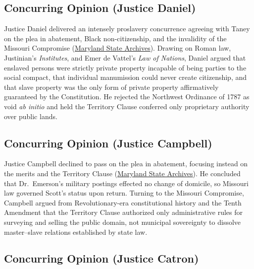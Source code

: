 \documentclass[12pt]{article}
\begin{document}
\subsection{Concurring Opinion (Justice Daniel)}

Justice Daniel delivered an intensely proslavery concurrence agreeing with Taney on the plea in abatement, Black non-citizenship, and the invalidity of the Missouri Compromise (\href{https://msa.maryland.gov/megafile/msa/speccol/sc5300/sc5339/000091/000000/000004/restricted/dred_scott/decision/daniel.html}{Maryland State Archives}). Drawing on Roman law, Justinian's \textit{Institutes}, and Emer de Vattel's \textit{Law of Nations}, Daniel argued that enslaved persons were strictly private property incapable of being parties to the social compact, that individual manumission could never create citizenship, and that slave property was the only form of private property affirmatively guaranteed by the Constitution. He rejected the Northwest Ordinance of 1787 as void \textit{ab initio} and held the Territory Clause conferred only proprietary authority over public lands.

\subsection{Concurring Opinion (Justice Campbell)}

Justice Campbell declined to pass on the plea in abatement, focusing instead on the merits and the Territory Clause (\href{https://msa.maryland.gov/megafile/msa/speccol/sc5300/sc5339/000091/000000/000004/restricted/dred_scott/decision/campbell.html}{Maryland State Archives}). He concluded that Dr.\ Emerson's military postings effected no change of domicile, so Missouri law governed Scott's status upon return. Turning to the Missouri Compromise, Campbell argued from Revolutionary-era constitutional history and the Tenth Amendment that the Territory Clause authorized only administrative rules for surveying and selling the public domain, not municipal sovereignty to dissolve master--slave relations established by state law.

\subsection{Concurring Opinion (Justice Catron)}
\end{document}

